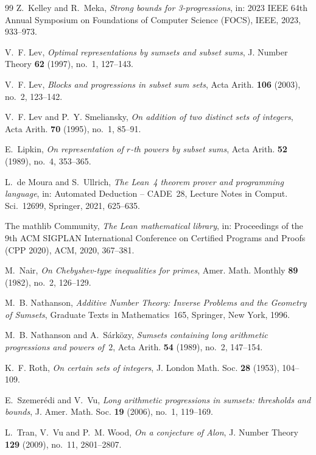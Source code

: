 \documentclass[11pt,reqno]{amsart}
\numberwithin{equation}{section}
\theoremstyle{definition}
\theoremstyle{remark}
\begin{document}
\begin{thebibliography}{99}
Z.~Kelley and R.~Meka, \emph{Strong bounds for 3-progressions}, in: 2023 IEEE 64th Annual Symposium on Foundations of Computer Science (FOCS), IEEE, 2023, 933--973.

V.~F. Lev, \emph{Optimal representations by sumsets and subset sums}, J. Number Theory \textbf{62} (1997), no.~1, 127--143.

V.~F. Lev, \emph{Blocks and progressions in subset sum sets}, Acta Arith. \textbf{106} (2003), no.~2, 123--142.

V.~F. Lev and P.~Y. Smeliansky, \emph{On addition of two distinct sets of integers}, Acta Arith. \textbf{70} (1995), no.~1, 85--91.

E.~Lipkin, \emph{On representation of $r$-th powers by subset sums}, Acta Arith. \textbf{52} (1989), no.~4, 353--365.

L.~de Moura and S.~Ullrich, \emph{The Lean~4 theorem prover and programming language}, in: Automated Deduction -- CADE~28, Lecture Notes in Comput. Sci.~12699, Springer, 2021, 625--635.

The mathlib Community, \emph{The Lean mathematical library}, in: Proceedings of the 9th ACM SIGPLAN International Conference on Certified Programs and Proofs (CPP 2020), ACM, 2020, 367--381.

M.~Nair, \emph{On Chebyshev-type inequalities for primes}, Amer. Math. Monthly \textbf{89} (1982), no.~2, 126--129.

M.~B. Nathanson, \emph{Additive Number Theory: Inverse Problems and the Geometry of Sumsets}, Graduate Texts in Mathematics~165, Springer, New York, 1996.

M.~B. Nathanson and A.~S\'ark\"ozy, \emph{Sumsets containing long arithmetic progressions and powers of~$2$}, Acta Arith. \textbf{54} (1989), no.~2, 147--154.

K.~F. Roth, \emph{On certain sets of integers}, J. London Math. Soc. \textbf{28} (1953), 104--109.

E.~Szemer\'edi and V.~Vu, \emph{Long arithmetic progressions in sumsets: thresholds and bounds}, J. Amer. Math. Soc. \textbf{19} (2006), no.~1, 119--169.

L.~Tran, V.~Vu and P.~M. Wood, \emph{On a conjecture of Alon}, J. Number Theory \textbf{129} (2009), no.~11, 2801--2807.

\end{thebibliography}
\end{document}

